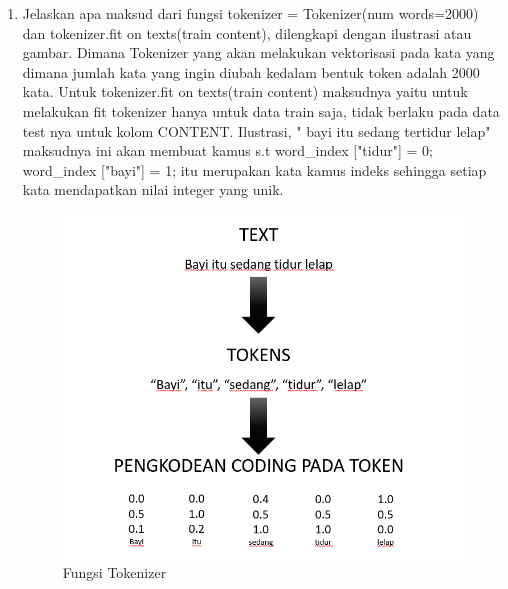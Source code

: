 \begin{enumerate}
\item Jelaskan apa maksud dari fungsi tokenizer = Tokenizer(num words=2000) dan tokenizer.fit on texts(train content), dilengkapi dengan ilustrasi atau gambar.
\subitem Dimana Tokenizer yang akan melakukan vektorisasi pada kata yang dimana jumlah kata yang ingin diubah kedalam bentuk token adalah 2000 kata. Untuk tokenizer.fit on texts(train content) maksudnya yaitu untuk melakukan fit tokenizer hanya untuk data train saja, tidak berlaku pada data test nya untuk kolom CONTENT. Ilustrasi, " bayi itu sedang tertidur lelap" maksudnya ini akan membuat kamus s.t word\_index ["tidur"] = 0; word\_index ["bayi"] = 1; itu merupakan kata  kamus indeks sehingga setiap kata mendapatkan nilai integer yang unik.
\begin{figure}[!htbp]
	\centerline{\includegraphics[width=1\textwidth]{figures/andi/7-5.PNG}}
	\caption{Fungsi Tokenizer}
	\label{Teori}
\end{figure}


\end{enumerate}
